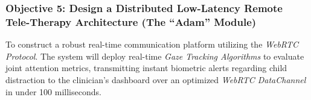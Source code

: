 \documentclass[
  letterpaper,
  DIV=11,
  numbers=noendperiod]{scrartcl}
\begin{document}
\subsubsection{Objective 5: Design a Distributed Low-Latency Remote
Tele-Therapy Architecture (The ``Adam''
Module)}\label{objective-5-design-a-distributed-low-latency-remote-tele-therapy-architecture-the-adam-module}

To construct a robust real-time communication platform utilizing the
\emph{WebRTC Protocol}. The system will deploy real-time \emph{Gaze
Tracking Algorithms} to evaluate joint attention metrics, transmitting
instant biometric alerts regarding child distraction to the clinician's
dashboard over an optimized \emph{WebRTC DataChannel} in under 100
milliseconds.
\end{document}
